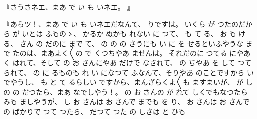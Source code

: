 『さうさネエ、まあ
で
い
も
いネエ。
』

『あらツ！、まあ
で
い
も
いネエだなんて、
りですは。
いくら
が
つたのだから
が
いとは
ふものゝ、
かるか
ぬかも
れない
に
つて、
も
て
る、
お
も
ける、
さん
の
だのに
まで
て、
の
の
の
さうにも
い
に
を
せるといふやうな
まで
たのは、まあよく〳〵の
で
くつちやあ
ませんは。
それだのに
つてる
にやあ
く
はれて、そして
の
お
さんにやあ
だけで
なされて、
の
ぢやあ
を
して
つて
られて、
の
に
るものも
れ
い
になつて
ふなんて、そりやあ
のことですから
いでやうし、
も
と
て
るらしい
ですから、まんざらくよ〳〵も
ますまいが、
が
し
の
の
だつたら、まあ
なでしやう！。
の
お
さんの
が
れて
しくでもなつたら
みも
ましやうが、
し
お
さんは
お
さんで
までも
を
り、
お
さんは
お
さんで
の
ばかりで
つて
つたら、
だつて
つた
の
しさは
と
ひも
